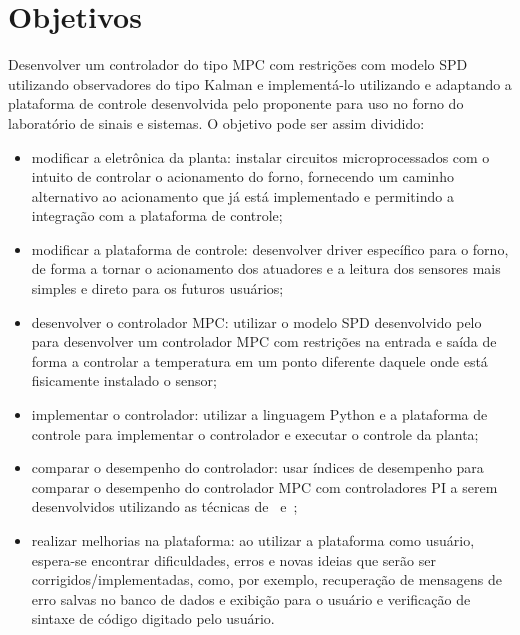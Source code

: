 
\chapter{Objetivos}%
\label{sec:objectives}

Desenvolver um controlador do tipo MPC com restrições com modelo SPD utilizando
observadores do tipo Kalman e implementá-lo utilizando e adaptando a plataforma
de controle desenvolvida pelo proponente para uso no forno do laboratório de
sinais e sistemas. O objetivo pode ser assim dividido:

\begin{itemize}
      \item modificar a eletrônica da planta: instalar circuitos
            microprocessados com o intuito de controlar o acionamento do forno,
            fornecendo um caminho alternativo ao acionamento que já está
            implementado e permitindo a integração com a plataforma de controle;
      \item modificar a plataforma de controle: desenvolver driver específico
            para o forno, de forma a tornar o acionamento dos atuadores e a
            leitura dos sensores mais simples e direto para os futuros usuários;
      \item desenvolver o controlador MPC\@: utilizar o modelo SPD desenvolvido
            pelo~\textcite{masterthesis:nelson} para desenvolver um
            controlador MPC com restrições na entrada e saída de forma a
            controlar a temperatura em um ponto diferente daquele onde está
            fisicamente instalado o sensor;
      \item implementar o controlador: utilizar a linguagem Python e a
            plataforma de controle para implementar o controlador e executar o
            controle da planta;
      \item comparar o desempenho do controlador: usar índices de desempenho
            para comparar o desempenho do controlador MPC com controladores PI a
            serem desenvolvidos utilizando as técnicas
            de~\textcite{article:clarke} e~\textcite{article:martins};
      \item realizar melhorias na plataforma: ao utilizar a plataforma como
            usuário, espera-se encontrar dificuldades, erros e novas ideias que
            serão ser corrigidos/implementadas, como, por exemplo, recuperação
            de mensagens de erro salvas no banco de dados e exibição para o
            usuário e verificação de sintaxe de código digitado pelo usuário.
\end{itemize}
